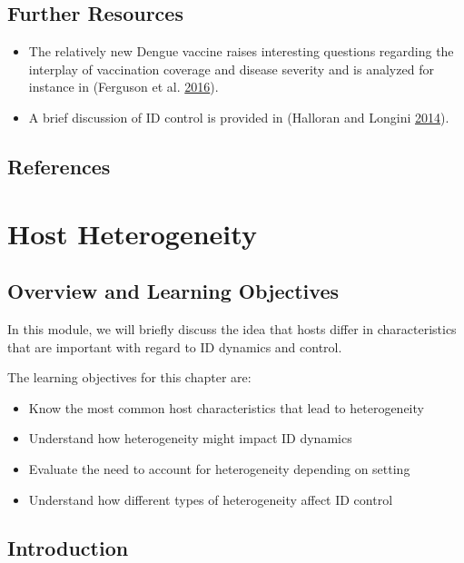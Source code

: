 \documentclass[]{book}
\providecommand{\tightlist}{%
  \setlength{\itemsep}{0pt}\setlength{\parskip}{0pt}}
\theoremstyle{definition}
\theoremstyle{definition}
\theoremstyle{definition}
\theoremstyle{remark}
\begin{document}
\section{Further Resources}\label{further-resources-8}

\begin{itemize}
\tightlist
\item
  The relatively new Dengue vaccine raises interesting questions
  regarding the interplay of vaccination coverage and disease severity
  and is analyzed for instance in (Ferguson et al.
  \protect\hyperlink{ref-ferguson16}{2016}).
\item
  A brief discussion of ID control is provided in (Halloran and Longini
  \protect\hyperlink{ref-halloran14}{2014}).
\end{itemize}

\section{References}\label{references-9}

\chapter{Host Heterogeneity}\label{host-heterogeneity}

\section{Overview and Learning
Objectives}\label{overview-and-learning-objectives-9}

In this module, we will briefly discuss the idea that hosts differ in
characteristics that are important with regard to ID dynamics and
control.

The learning objectives for this chapter are:

\begin{itemize}
\tightlist
\item
  Know the most common host characteristics that lead to heterogeneity
\item
  Understand how heterogeneity might impact ID dynamics
\item
  Evaluate the need to account for heterogeneity depending on setting
\item
  Understand how different types of heterogeneity affect ID control
\end{itemize}

\section{Introduction}\label{introduction-9}
\end{document}

